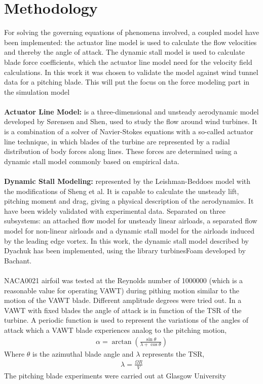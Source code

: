 \documentclass[a4paper]{jpconf}
\begin{document}
\section{Methodology}
For solving the governing equations of phenomena involved, a coupled model have been implemented: the actuator line model is used to calculate the flow velocities and thereby the angle of attack. The dynamic stall model is used to calculate blade force coefficients, which the actuator line model need for the velocity field calculations. In this work it was chosen to validate the model against wind tunnel data for a pitching blade. This will put the focus on the force modeling part in the simulation model\\
\\
\textbf{Actuator Line Model:} is a three-dimensional and unsteady aerodynamic model developed by S{\o}rensen and Shen\cite{sorensen1999computation}, used to study the flow around wind turbines. It is a combination of a solver of Navier-Stokes equations with a so-called actuator line technique, in which blades of the turbine are represented by a radial distribution of body forces along lines. These forces are determined using a dynamic stall model commonly based on empirical data.\\
\\
\textbf{Dynamic Stall Modeling:} represented by the Leishman-Beddoes model\cite{leishman1986generalised} with the modifications of Sheng et al\cite{sheng2008modified}. It is capable to calculate the unsteady lift, pitching moment and drag, giving a physical description of the aerodynamics. It have been widely validated with experimental data\cite{leishman1989semi}. Separated on three subsystems: an attached flow model for unsteady linear airloads, a separated flow model for non-linear airloads and a dynamic stall model for the airloads induced by the leading edge vortex. In this work, the dynamic stall model described by Dyachuk\cite{dyachuk} has been implemented, using the library turbinesFoam developed by Bachant\cite{bachant2015simulating}.\\
\\
NACA0021 airfoil was tested at the Reynolds number of 1000000 (which is a reasonable value for operating VAWT) during pithing motion similar to the motion of the VAWT blade. Different amplitude degrees were tried out. In a VAWT with fixed blades the angle of attack is in function of the TSR of the turbine. A periodic function is used to represent the variations of the angles of attack which a VAWT blade experiences analog to the pitching motion,
\begin{eqnarray}
\alpha = \arctan \left( \frac{\sin \theta}{\lambda + \cos \theta} \right)
\end{eqnarray}
Where $\theta$ is the azimuthal blade angle and $ \lambda $ represents the TSR,
\begin{eqnarray}
\lambda =  \frac{\Omega R}{V}
\end{eqnarray}
The pitching blade experiments were carried out at Glasgow University\cite{angell1988collected}\\
\end{document}
